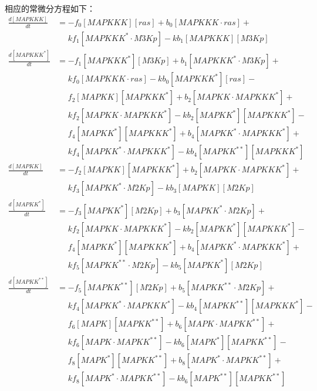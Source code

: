 相应的常微分方程如下：
\small
\begin{equation*}
  \begin{align*}
    \frac{d[MAPKKK]}{dt} &= -f_{0}[MAPKKK][ras] + b_{0}[MAPKKK\cdot{}ras] +\\
    &\phantom{=} kf_{1}[MAPKKK^{*}\cdot{}M3Kp] - kb_{1}[MAPKKK][M3Kp]\\
    \frac{d[MAPKKK^{*}]}{dt} &= -f_{1}[MAPKKK^{*}][M3Kp] + b_{1}[MAPKKK^{*}\cdot{}M3Kp] +\\
    &\phantom{=} kf_{0}[MAPKKK\cdot{}ras] - kb_{0}[MAPKKK^{*}][ras] -\\
    &\phantom{=} f_{2}[MAPKK][MAPKKK^{*}] + b_{2}[MAPKK\cdot{}MAPKKK^{*}] +\\
    &\phantom{=} kf_{2}[MAPKK\cdot{}MAPKKK^{*}] - kb_{2}[MAPKK^{*}][MAPKKK^{*}] -\\
    &\phantom{=} f_{4}[MAPKK^{*}][MAPKKK^{*}] + b_{4}[MAPKK^{*}\cdot{}MAPKKK^{*}] +\\
    &\phantom{=} kf_{4}[MAPKK^{*}\cdot{}MAPKKK^{*}] - kb_{4}[MAPKK^{**}][MAPKKK^{*}]\\
    \frac{d[MAPKK]}{dt} &= -f_{2}[MAPKK][MAPKKK^{*}] + b_{2}[MAPKK\cdot{}MAPKKK^{*}] +\\
    &\phantom{=} kf_{3}[MAPKK^{*}\cdot{}M2Kp] - kb_{3}[MAPKK][M2Kp]\\
    \frac{d[MAPKK^{*}]}{dt} &= -f_{3}[MAPKK^{*}][M2Kp] + b_{3}[MAPKK^{*}\cdot{}M2Kp] +\\
    &\phantom{=} kf_{2}[MAPKK\cdot{}MAPKKK^{*}] - kb_{2}[MAPKK^{*}][MAPKKK^{*}] -\\
    &\phantom{=} f_{4}[MAPKK^{*}][MAPKKK^{*}] + b_{4}[MAPKK^{*}\cdot{}MAPKKK^{*}] +\\
    &\phantom{=} kf_{5}[MAPKK^{**}\cdot{}M2Kp] - kb_{5}[MAPKK^{*}][M2Kp]\\
    \frac{d[MAPKK^{**}]}{dt} &= -f_{5}[MAPKK^{**}][M2Kp] + b_{5}[MAPKK^{**}\cdot{}M2Kp] +\\
    &\phantom{=} kf_{4}[MAPKK^{*}\cdot{}MAPKKK^{*}] - kb_{4}[MAPKK^{**}][MAPKKK^{*}] -\\
    &\phantom{=} f_{6}[MAPK][MAPKK^{**}] + b_{6}[MAPK\cdot{}MAPKK^{**}] +\\
    &\phantom{=} kf_{6}[MAPK\cdot{}MAPKK^{**}] - kb_{6}[MAPK^{*}][MAPKK^{**}] -\\
    &\phantom{=} f_{8}[MAPK^{*}][MAPKK^{**}] + b_{8}[MAPK^{*}\cdot{}MAPKK^{**}] +\\
    &\phantom{=} kf_{8}[MAPK^{*}\cdot{}MAPKK^{**}] - kb_{6}[MAPK^{**}][MAPKK^{**}]\\

\end{align*}
\end{equation*}

